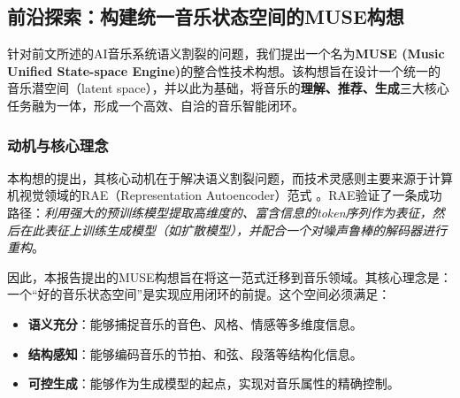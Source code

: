 \documentclass[12pt]{article}
\begin{document}
\subsection{前沿探索：构建统一音乐状态空间的MUSE构想}
针对前文所述的AI音乐系统语义割裂的问题，我们提出一个名为\textbf{MUSE (Music Unified State-space Engine)}的整合性技术构想。该构想旨在设计一个统一的音乐潜空间（latent space），并以此为基础，将音乐的\textbf{理解、推荐、生成}三大核心任务融为一体，形成一个高效、自洽的音乐智能闭环。

\subsubsection{动机与核心理念}
本构想的提出，其核心动机在于解决语义割裂问题，而技术灵感则主要来源于计算机视觉领域的RAE（Representation Autoencoder）范式 \cite{pourheydari2024rae}。RAE验证了一条成功路径：\textit{利用强大的预训练模型提取高维度的、富含信息的token序列作为表征，然后在此表征上训练生成模型（如扩散模型），并配合一个对噪声鲁棒的解码器进行重构}。

因此，本报告提出的MUSE构想旨在将这一范式迁移到音乐领域。其核心理念是：一个“好的音乐状态空间”是实现应用闭环的前提。这个空间必须满足：
\begin{itemize}
    \item \textbf{语义充分}：能够捕捉音乐的音色、风格、情感等多维度信息。
    \item \textbf{结构感知}：能够编码音乐的节拍、和弦、段落等结构化信息。
    \item \textbf{可控生成}：能够作为生成模型的起点，实现对音乐属性的精确控制。
\end{itemize}
\end{document}
